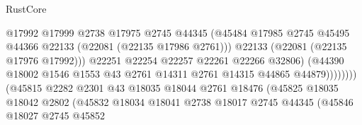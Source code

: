 \begin{lexlean}{RustCore}
\begin{coremodule}
                                              @17992
                                              @17999
                                              @2738
                                              @17975
                                              @2745
                                              @44345
                                              (@45484
                                                @17985
                                                @2745
                                                @45495
                                                @44366
                                                @22133
                                                (@22081 (@22135 @17986 @2761)))
                                              @22133
                                              (@22081 (@22135 @17976 @17992)))
                                            @22251
                                            @22254
                                            @22257
                                            @22261
                                            @22266
                                            @32806)
                                          (@44390
                                            @18002
                                            @1546
                                            @1553
                                            @43
                                            @2761
                                            @14311
                                            @2761
                                            @14315
                                            @44865
                                            @44879))))))))
                            (@45815
                              @2282
                              @2301
                              @43
                              @18035
                              @18044
                              @2761
                              @18476
                              (@45825
                                @18035
                                @18042
                                @2802
                                (@45832
                                  @18034
                                  @18041
                                  @2738
                                  @18017
                                  @2745
                                  @44345
                                  (@45846
                                    @18027
                                    @2745
                                    @45852

\end{coremodule}
\end{lexlean}
